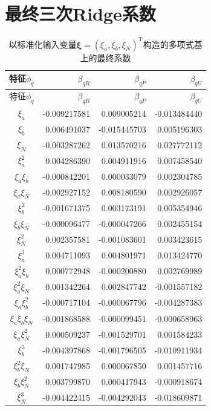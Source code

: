 \documentclass[UTF8,12pt,a4paper]{ctexart}
\begin{document}
\section{最终三次Ridge系数}
\begin{longtable}{crrr}
\caption{以标准化输入变量$\bm\xi=(\xi_a,\xi_b,\xi_N)^{\mathrm T}$构造的多项式基上的最终系数}\label{tab:coef}\\
\toprule
特征$\phi_q$ & $\beta_{qR}$ & $\beta_{qP}$ & $\beta_{qU}$ \\
\midrule
\endfirsthead
\toprule
特征$\phi_q$ & $\beta_{qR}$ & $\beta_{qP}$ & $\beta_{qU}$ \\
\midrule
\endhead
$\xi_a$ & -0.009217581 & 0.009005214 & -0.013484440 \\
$\xi_b$ & 0.006491037 & -0.015445703 & 0.005196303 \\
$\xi_N$ & -0.003287262 & 0.013570216 & 0.027772112 \\
$\xi_a^{2}$ & 0.004286390 & 0.004911916 & 0.007458540 \\
$\xi_a\xi_b$ & -0.000842201 & 0.000033079 & 0.002304785 \\
$\xi_a\xi_N$ & -0.002927152 & 0.008180590 & 0.002926057 \\
$\xi_b^{2}$ & -0.001671375 & 0.003173191 & 0.005354946 \\
$\xi_b\xi_N$ & -0.000096477 & -0.000047266 & 0.002455154 \\
$\xi_N^{2}$ & 0.002357581 & -0.001083601 & 0.003423615 \\
$\xi_a^{3}$ & 0.004711093 & 0.004801971 & 0.013424770 \\
$\xi_a^{2}\xi_b$ & 0.000772948 & -0.000200880 & 0.002769989 \\
$\xi_a^{2}\xi_N$ & 0.001342264 & 0.002847742 & -0.001557182 \\
$\xi_a\xi_b^{2}$ & -0.000717104 & -0.000067796 & -0.004287383 \\
$\xi_a\xi_b\xi_N$ & -0.001868588 & -0.000099451 & -0.000658963 \\
$\xi_a\xi_N^{2}$ & 0.000509237 & -0.001529701 & 0.001584233 \\
$\xi_b^{3}$ & -0.004397868 & -0.001796505 & -0.010911934 \\
$\xi_b^{2}\xi_N$ & 0.001747985 & 0.000067850 & 0.001457716 \\
$\xi_b\xi_N^{2}$ & 0.003799870 & 0.000417943 & -0.000918674 \\
$\xi_N^{3}$ & -0.004422415 & -0.004292043 & -0.018609871 \\
\bottomrule
\end{longtable}
\end{document}
